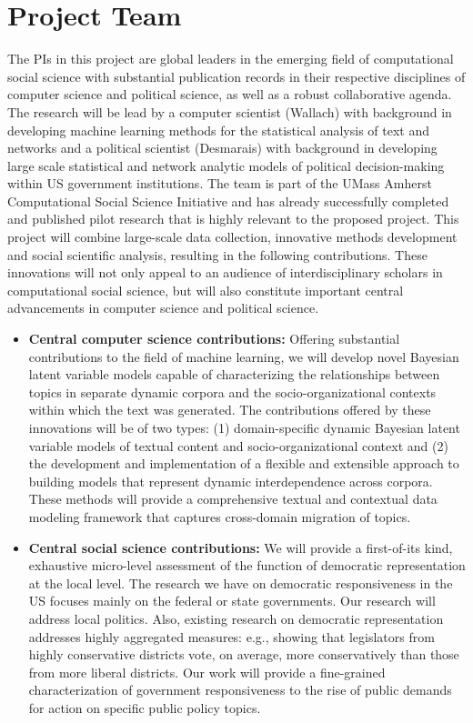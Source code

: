 \section{Project Team}

The PIs in this project are global leaders in the emerging field of computational social science with substantial publication records in their respective disciplines of computer science and political science, as well as a robust collaborative agenda. The research will be lead by a computer scientist (Wallach) with background in developing machine learning methods for the statistical analysis of text and networks and a political scientist (Desmarais) with background in developing large scale statistical and network analytic models of political decision-making within US government institutions. The team is part of the UMass Amherst Computational Social Science Initiative and has already successfully completed and published pilot research that is highly relevant to the proposed project. This project will combine large-scale data collection, innovative methods development and social scientific analysis, resulting in the following contributions. These innovations will not only appeal to an audience of interdisciplinary scholars in computational social science, but will also constitute important central advancements in computer science and political science.

\begin{itemize}
\item {\bf Central computer science contributions:} Offering substantial contributions to the field of machine learning, we will develop novel Bayesian latent variable models capable of characterizing the relationships between topics in separate dynamic corpora and the socio-organizational contexts within which the text was generated. The contributions offered by these innovations will be of two types: (1) domain-specific dynamic Bayesian latent variable models of textual content and socio-organizational context and (2) the development and implementation of a flexible and extensible approach to building models that represent dynamic interdependence across corpora. These methods will provide a comprehensive textual and contextual data modeling framework that captures cross-domain migration of topics.
\item {\bf Central social science contributions:} We will provide a first-of-its kind, exhaustive micro-level assessment of the function of  democratic representation at the local level. The research we have on democratic responsiveness in the US focuses mainly on the federal or state governments. Our research will address local politics. Also, existing research on democratic representation addresses highly aggregated measures: e.g., showing that legislators from highly conservative districts vote, on average, more conservatively than those from more liberal districts. Our work will provide a fine-grained characterization of government responsiveness to the rise of public demands for action on specific public policy topics.
\end{itemize}



